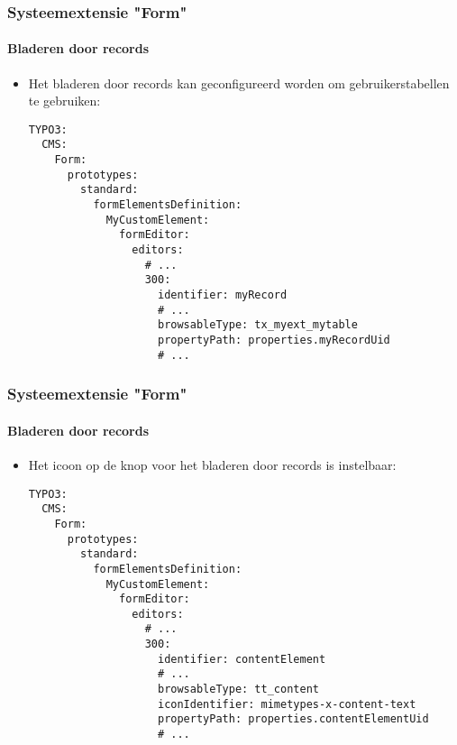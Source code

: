 
\begin{frame}[fragile]
	\frametitle{Systeemextensie "Form"}
	\framesubtitle{Bladeren door records}

	\lstset{basicstyle=\tiny\ttfamily}

	\begin{itemize}
		\item Het bladeren door records kan geconfigureerd worden om gebruikerstabellen te gebruiken:
\begin{lstlisting}
TYPO3:
  CMS:
    Form:
      prototypes:
        standard:
          formElementsDefinition:
            MyCustomElement:
              formEditor:
                editors:
                  # ...
                  300:
                    identifier: myRecord
                    # ...
                    browsableType: tx_myext_mytable
                    propertyPath: properties.myRecordUid
                    # ...
\end{lstlisting}

	\end{itemize}

\end{frame}


\begin{frame}[fragile]
	\frametitle{Systeemextensie "Form"}
	\framesubtitle{Bladeren door records}

	\lstset{basicstyle=\tiny\ttfamily}

	\begin{itemize}
		\item Het icoon op de knop voor het bladeren door records is instelbaar:
\begin{lstlisting}
TYPO3:
  CMS:
    Form:
      prototypes:
        standard:
          formElementsDefinition:
            MyCustomElement:
              formEditor:
                editors:
                  # ...
                  300:
                    identifier: contentElement
                    # ...
                    browsableType: tt_content
                    iconIdentifier: mimetypes-x-content-text
                    propertyPath: properties.contentElementUid
                    # ...
\end{lstlisting}

	\end{itemize}

\end{frame}

